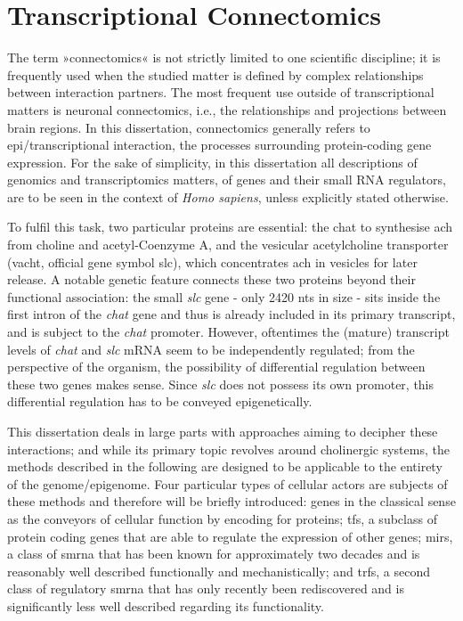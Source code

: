 \section{Transcriptional Connectomics}
The term »connectomics« is not strictly limited to one scientific discipline; it is frequently used when the studied matter is defined by complex relationships between interaction partners. The most frequent use outside of transcriptional matters is neuronal connectomics, i.e., the relationships and projections between brain regions. In this dissertation, connectomics generally refers to epi\-/transcriptional interaction, the processes surrounding protein-coding gene expression. For the sake of simplicity, in this dissertation all descriptions of genomics and transcriptomics matters, of genes and their small RNA regulators, are to be seen in the context of \textit{Homo sapiens}, unless explicitly stated otherwise.

 To fulfil this task, two particular proteins are essential: the \ac{chat} to synthesise \ac{ach} from choline and acetyl-Coenzyme A, and the vesicular acetylcholine transporter (\acs{vacht}, official gene symbol \acs{slc}), which concentrates \ac{ach} in vesicles for later release. A notable genetic feature connects these two proteins beyond their functional association: the small \textit{\ac{slc}} gene - only 2420 \acp{nt} in size - sits inside the first intron of the \textit{\ac{chat}} gene and thus is already included in its primary transcript, and is subject to the \textit{\ac{chat}} promoter. However, oftentimes the (mature) transcript levels of \textit{\ac{chat}} and \textit{\ac{slc}} mRNA seem to be independently regulated; from the perspective of the organism, the possibility of differential regulation between these two genes makes sense. Since \textit{\ac{slc}} does not possess its own promoter, this differential regulation has to be conveyed epigenetically. 

This dissertation deals in large parts with approaches aiming to decipher these interactions; and while its primary topic revolves around cholinergic systems, the methods described in the following are designed to be applicable to the entirety of the genome/epigenome. Four particular types of cellular actors are subjects of these methods and therefore will be briefly introduced: genes in the classical sense as the conveyors of cellular function by encoding for proteins; \acp{tf}, a subclass of protein coding genes that are able to regulate the expression of other genes; \acp{mir}, a class of \ac{smrna} that has been known for approximately two decades and is reasonably well described functionally and mechanistically; and \acp{trf}, a second class of regulatory \ac{smrna} that has only recently been rediscovered and is significantly less well described regarding its functionality.

